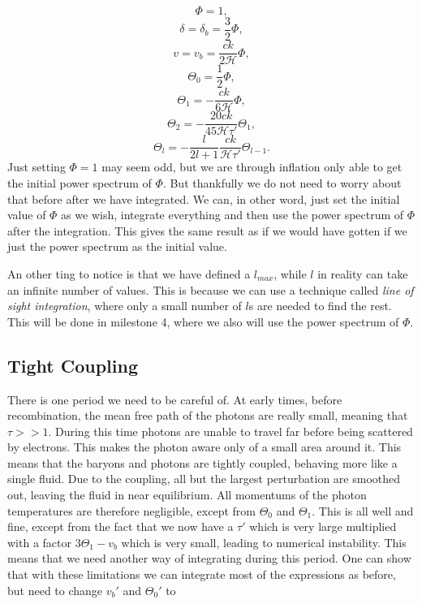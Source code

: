 \documentclass[a4paper,norsk, 10pt]{article}
\begin{document}
\begin{equation}
\Phi = 1,
\end{equation}
\begin{equation}
\delta = \delta_b = \frac{3}{2}\Phi,
\end{equation}
\begin{equation}
v = v_b = \frac{ck}{2\mathcal{H}}\Phi,
\end{equation}
\begin{equation}
\Theta_0 = \frac{1}{2}\Phi,
\end{equation}
\begin{equation}
\Theta_1 = -\frac{ck}{6\mathcal{H}}\Phi,
\end{equation}
\begin{equation}
\Theta_2 = -\frac{20ck}{45\mathcal{H}\tau'}\Theta_1,
\end{equation}
\begin{equation}
\Theta_l = -\frac{l}{2l+1}\frac{ck}{\mathcal{H}\tau'}\Theta_{l-1}.
\end{equation}
Just setting $\Phi = 1$ may seem odd, but we are through inflation only able to get the initial power spectrum of $\Phi$. But thankfully we do not need to worry about that before after we have integrated. We can, in other word, just set the initial value of $\Phi$ as we wish, integrate everything and then use the power spectrum of $\Phi$ after the integration. This gives the same result as if we would have gotten if we just the power spectrum as the initial value.

An other ting to notice is that we have defined a $l_{max}$, while $l$ in reality can take an infinite number of values. This is because we can use a technique called \textit{line of sight integration}, where only a small number of $l$s are needed to find the rest. This will be done in milestone 4, where we also will use the power spectrum of $\Phi$.


\subsection{Tight Coupling}\label{sec:tight}
There is one period we need to be careful of. At early times, before recombination, the mean free path of the photons are really small, meaning that $\tau >> 1$. During this time photons are unable to travel far before being scattered by electrons. This makes the photon aware only of a small area around it. This means that the baryons and photons are tightly coupled, behaving more like a single fluid. Due to the coupling, all but the largest perturbation are smoothed out, leaving the fluid in near equilibrium. All momentums of the photon temperatures are therefore negligible, except from $\Theta_0$ and $\Theta_1$. This is all well and fine, except from the fact that we now have a $\tau'$ which is very large multiplied with a factor $3\Theta_1-v_b$ which is very small, leading to numerical instability. This means that we need another way of integrating during this period. One can show that with these limitations we can integrate most of the expressions as before, but need to change $v_b'$ and $\Theta_0'$ to
\end{document}
